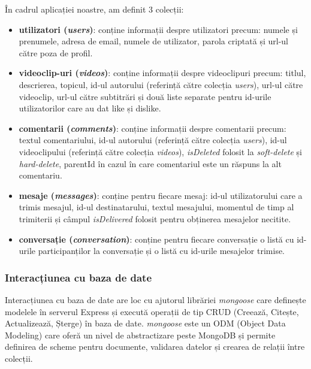 \par
În cadrul aplicației noastre, am definit 3 colecții:
\begin{itemize}
    \item \textbf{utilizatori (\textit{users})}: conține informații despre utilizatori precum: numele și prenumele, adresa de
    email, numele de utilizator, parola criptată și url-ul către poza de profil.
    \item \textbf{videoclip-uri (\textit{videos})}: conține informații despre videoclipuri precum: titlul, descrierea, topicul,
    id-ul autorului (referință către colecția \textit{users}), url-ul către videoclip, url-ul către
    subtitrări și două liste separate pentru id-urile utilizatorilor care au dat like și dislike.
    \item \textbf{comentarii (\textit{comments})}: conține informații despre comentarii precum: textul comentariului, 
    id-ul autorului (referință către colecția \textit{users}), id-ul videoclipului (referință către
    colecția \textit{videos}), \textit{isDeleted} folosit la \textit{soft-delete} și \textit{hard-delete}, 
    parentId în cazul în care comentariul este un răspuns la alt comentariu.
    \item \textbf{mesaje (\textit{messages})}: conține pentru fiecare mesaj: id-ul utilizatorului care a trimis mesajul,
    id-ul destinatarului, textul mesajului, momentul de timp al trimiterii și câmpul \textit{isDelivered} folosit pentru
    obținerea mesajelor necitite.
    \item \textbf{conversație (\textit{conversation})}: conține pentru fiecare conversație o listă cu id-urile participanților
    la conversație și o listă cu id-urile mesajelor trimise.
\end{itemize}

\subsubsection{Interacțiunea cu baza de date}

\par
Interacțiunea cu baza de date are loc cu ajutorul librăriei \textit{mongoose} care definește modelele
în serverul Express și execută operații de tip CRUD (Creează, Citește, Actualizează, Șterge) în baza de date.
\textit{mongoose} este un ODM (Object Data Modeling) care oferă un nivel de abstractizare peste MongoDB
și permite definirea de scheme pentru documente, validarea datelor și crearea de relații între colecții.

